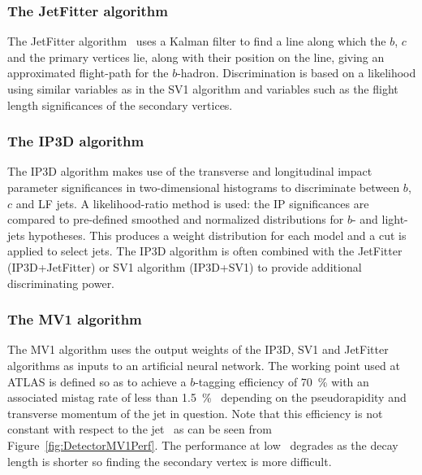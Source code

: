 \subsubsection{The JetFitter algorithm}

The JetFitter algorithm~\cite{Detector:TaggingJetFitter} uses a Kalman filter to find a line along which the $b$, $c$ and the primary vertices lie, along with their position on the line, giving an approximated flight-path for the $b$-hadron. Discrimination is based on a likelihood using similar variables as in the SV1 algorithm and variables such as the flight length significances of the secondary vertices.

\subsubsection{The IP3D algorithm}

The IP3D algorithm makes use of the transverse and longitudinal impact parameter significances in two-dimensional histograms to discriminate between $b$, $c$ and LF jets. A likelihood-ratio method is used: the IP significances are compared to pre-defined smoothed and normalized distributions for $b$- and light-jets hypotheses. This produces a weight distribution for each model and a cut is applied to select jets. The IP3D algorithm is often combined with the JetFitter (IP3D+JetFitter) or SV1 algorithm (IP3D+SV1) to provide additional discriminating power.

\subsubsection{The MV1 algorithm}

The MV1 algorithm uses the output weights of the IP3D, SV1 and JetFitter algorithms as inputs to an artificial neural network. The working point used at ATLAS is defined so as to achieve a $b$-tagging efficiency of \SI{70}{\percent} with an associated mistag rate of less than \SI{1.5}{\percent}~\cite{DetectorBtaggingMistagMV1} depending on the pseudorapidity and transverse momentum of the jet in question. Note that this efficiency is not constant with respect to the jet \pt\ as can be seen from Figure~\ref{fig:DetectorMV1Perf}. The performance at low \pt\ degrades as the decay length is shorter so finding the secondary vertex is more difficult.

